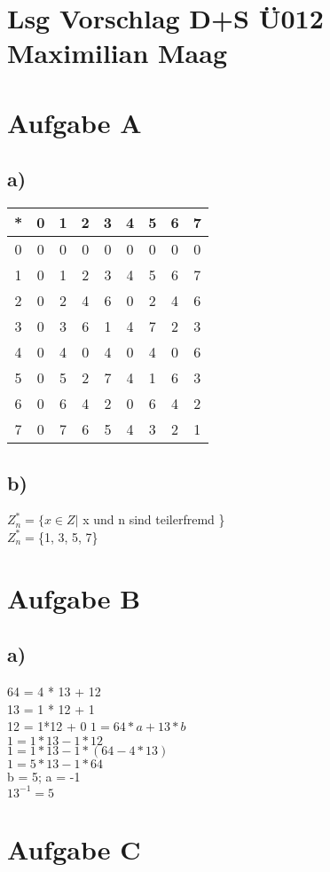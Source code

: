 \documentclass{article}
\begin{document}
	\section*{Lsg Vorschlag D+S Ü012 Maximilian Maag}
	\section*{Aufgabe A}
	\subsection*{a)}
	\begin{tabular}[h]{c|cccccccc}
		* &0 &1 &2 &3 &4 &5 &6 &7 \\
		\hline
		0& 0&0 &0 &0 &0 &0 &0 &0 \\
		1&0 &1 &2 &3 &4 &5 &6 &7 \\
		2&0 &2 &4 &6 &0 &2 &4 &6 \\
		3&0 &3 &6 &1 &4 &7 &2 &3 \\
		4&0 &4 &0 &4 &0 &4 &0 &6 \\
		5&0 &5 &2 &7 &4 &1 &6 &3 \\
		6&0 &6 &4 &2 &0 &6 &4 &2 \\
		7&0 &7 &6 &5 &4 &3 &2 &1 \\
	\end{tabular}
	\subsection*{b)}
	$Z_n^* = \{x \in Z |$ x und n sind teilerfremd \} \\
	$Z_n^* = $\{1, 3, 5, 7\}
	\section*{Aufgabe B}
	\subsection*{a)}
	64 = 4 * 13 + 12 \\
	13 = 1 * 12 + 1 \\
	12 = 1*12 + 0
	$1 = 64 * a + 13 * b$ \\
	$1 = 1 *13 - 1 * 12$ \\
	$1 = 1*13 - 1 * (64-4*13)$ \\
	$1 = 5 * 13 - 1 *64 $ \\
	b = 5; a = -1 \\
	$13^{-1} = 5$ 
	\section*{Aufgabe C}
\end{document}

